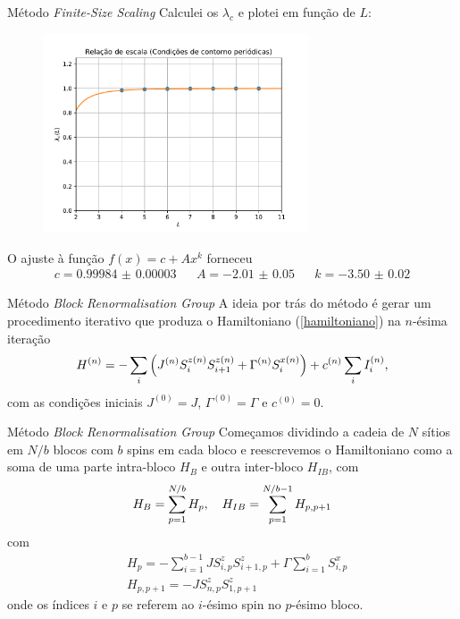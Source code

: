 \documentclass[brazil]{beamer}
\begin{document}
\begin{frame}{Método \textit{Finite-Size Scaling}}
    Calculei os \( \lambda_c \) e plotei em função de \( L \):
    \begin{figure}
        \centering
        \includegraphics[width=0.7\textwidth]{rel_escala_ccp.pdf}
    \end{figure}
    O ajuste à função \( f(x) = c + A x^k \) forneceu
    \begin{align*}
        c = \num{0.99984(3)} & & A = \num{-2.01(5)} & & k = \num{-3.50(2)}
    \end{align*}
\end{frame}

\begin{frame}{Método \textit{Block Renormalisation Group}}
    A ideia por trás do método é gerar um procedimento iterativo que produza o Hamiltoniano (\ref{hamiltoniano}) na \( n \)-ésima iteração
    \begin{equation}
        H^{(n)} = - \sum_i \qty( J^{(n)} S_i^{z (n)} S_{i + 1}^{z (n)} + \Gamma^{(n)} S_i^{x (n)} ) + c^{(n)} \sum_i I_i^{(n)} ,
    \end{equation}
    com as condições iniciais \( J^{(0)} = J \), \( \Gamma^{(0)} = \Gamma \) e \( c^{(0)} = 0 \).
\end{frame}

\begin{frame}{Método \textit{Block Renormalisation Group}}
    Começamos dividindo a cadeia de \( N \) sítios em \( N / b \) blocos com \( b \) spins em cada bloco e
    reescrevemos o Hamiltoniano como a soma de uma parte intra-bloco \( H_B \) e outra inter-bloco \( H_{IB} \), com
    \begin{equation}
        H_B = \sum_{p = 1}^{N / b} H_p \qc H_{IB} = \sum_{p = 1}^{N / b - 1} H_{p, p + 1}
    \end{equation}
    com
    \begin{align}
         & H_p = - \sum_{i = 1}^{b - 1} J S_{i, p}^z S_{i + 1, p}^z + \Gamma \sum_{i = 1}^b S_{i, p}^x \\
         & H_{p, p + 1} = - J S_{n, p}^z S_{1, p + 1}^z
    \end{align}
    onde os índices \( i \) e \( p \) se referem ao \( i \)-ésimo spin no \( p \)-ésimo bloco.
\end{frame}
\end{document}

